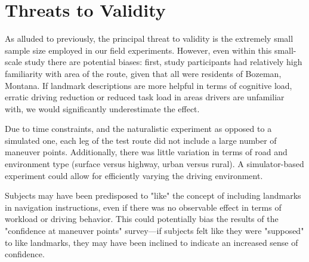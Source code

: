 \section{Threats to Validity}

As alluded to previously, the principal threat to validity is the extremely small sample size employed in our field experiments. However, even within this small-scale study there are potential biases: first, study participants had relatively high familiarity with area of the route, given that all were residents of Bozeman, Montana. If landmark descriptions are more helpful in terms of cognitive load, erratic driving reduction or reduced task load in areas drivers are unfamiliar with, we would significantly underestimate the effect.

Due to time constraints, and the naturalistic experiment as opposed to a simulated one, each leg of the test route did not include a large number of maneuver points. Additionally, there was little variation in terms of road and environment type (surface versus highway, urban versus rural). A simulator-based experiment could allow for efficiently varying the driving environment.

Subjects may have been predisposed to "like" the concept of including landmarks in navigation instructions, even if there was no observable effect in terms of workload or driving behavior. This could potentially bias the results of the "confidence at maneuver points" survey---if subjects felt like they were "supposed" to like landmarks, they may have been inclined to indicate an increased sense of confidence.